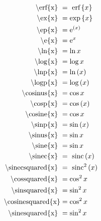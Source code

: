 \begin{subequations}
\begin{align}
\textrm{\textbackslash erf\{x\}          }  & = \erf{x}             \label{eqn:erf} \\
\textrm{\textbackslash ex\{x\}           }  & = \ex{x}              \label{eqn:ex} \\
\textrm{\textbackslash ep\{x\}           }  & = \ep{x}              \label{eqn:ep} \\
\textrm{\textbackslash e\{x\}            }  & = \e{x}               \label{eqn:e} \\
\textrm{\textbackslash ln\{x\}           }  & = \ln{x}              \label{eqn:ln} \\
\textrm{\textbackslash log\{x\}          }  & = \log{x}             \label{eqn:log} \\
\textrm{\textbackslash lnp\{x\}          }  & = \lnp{x}             \label{eqn:lnp} \\
\textrm{\textbackslash logp\{x\}         }  & = \logp{x}            \label{eqn:logp} \\
\textrm{\textbackslash cosinus\{x\}      }  & = \cosinus{x}         \label{eqn:cosinus} \\
\textrm{\textbackslash cosp\{x\}         }  & = \cosp{x}            \label{eqn:cosp} \\
\textrm{\textbackslash cosine\{x\}       }  & = \cosine{x}          \label{eqn:cosine} \\
\textrm{\textbackslash sinp\{x\}         }  & = \sinp{x}            \label{eqn:sinp} \\
\textrm{\textbackslash sinus\{x\}        }  & = \sinus{x}           \label{eqn:sinus} \\
\textrm{\textbackslash sine\{x\}         }  & = \sine{x}            \label{eqn:sine} \\
\textrm{\textbackslash sinec\{x\}        }  & = \sinec{x}           \label{eqn:sinec} \\
\textrm{\textbackslash sinecsquared\{x\} }  & = \sinecsquared{x}    \label{eqn:sinecsquared} \\
\textrm{\textbackslash cossquared\{x\}   }  & = \cossquared{x}      \label{eqn:cossquared} \\
\textrm{\textbackslash sinsquared\{x\}   }  & = \sinsquared{x}      \label{eqn:sinsquared} \\
\textrm{\textbackslash cosinesquared\{x\}}  & = \cosinesquared{x}   \label{eqn:cosinesquared} \\
\textrm{\textbackslash sinesquared\{x\}  }  & = \sinesquared{x}     \label{eqn:sinesquared} \\

\end{align}
\end{subequations}
